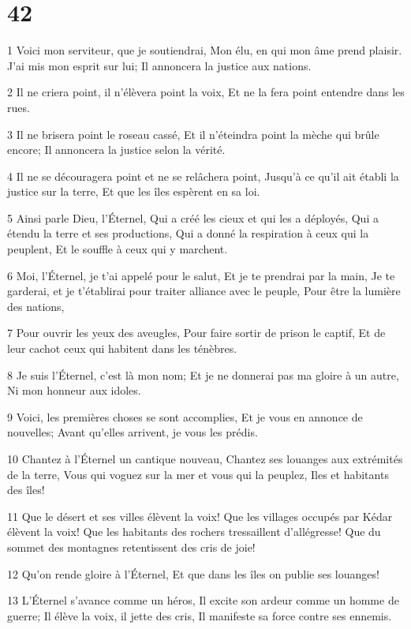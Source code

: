 \chapter{42}

\par 1 Voici mon serviteur, que je soutiendrai, Mon élu, en qui mon âme prend plaisir. J'ai mis mon esprit sur lui; Il annoncera la justice aux nations.
\par 2 Il ne criera point, il n'élèvera point la voix, Et ne la fera point entendre dans les rues.
\par 3 Il ne brisera point le roseau cassé, Et il n'éteindra point la mèche qui brûle encore; Il annoncera la justice selon la vérité.
\par 4 Il ne se découragera point et ne se relâchera point, Jusqu'à ce qu'il ait établi la justice sur la terre, Et que les îles espèrent en sa loi.
\par 5 Ainsi parle Dieu, l'Éternel, Qui a créé les cieux et qui les a déployés, Qui a étendu la terre et ses productions, Qui a donné la respiration à ceux qui la peuplent, Et le souffle à ceux qui y marchent.
\par 6 Moi, l'Éternel, je t'ai appelé pour le salut, Et je te prendrai par la main, Je te garderai, et je t'établirai pour traiter alliance avec le peuple, Pour être la lumière des nations,
\par 7 Pour ouvrir les yeux des aveugles, Pour faire sortir de prison le captif, Et de leur cachot ceux qui habitent dans les ténèbres.
\par 8 Je suis l'Éternel, c'est là mon nom; Et je ne donnerai pas ma gloire à un autre, Ni mon honneur aux idoles.
\par 9 Voici, les premières choses se sont accomplies, Et je vous en annonce de nouvelles; Avant qu'elles arrivent, je vous les prédis.
\par 10 Chantez à l'Éternel un cantique nouveau, Chantez ses louanges aux extrémités de la terre, Vous qui voguez sur la mer et vous qui la peuplez, Iles et habitants des îles!
\par 11 Que le désert et ses villes élèvent la voix! Que les villages occupés par Kédar élèvent la voix! Que les habitants des rochers tressaillent d'allégresse! Que du sommet des montagnes retentissent des cris de joie!
\par 12 Qu'on rende gloire à l'Éternel, Et que dans les îles on publie ses louanges!
\par 13 L'Éternel s'avance comme un héros, Il excite son ardeur comme un homme de guerre; Il élève la voix, il jette des cris, Il manifeste sa force contre ses ennemis.
